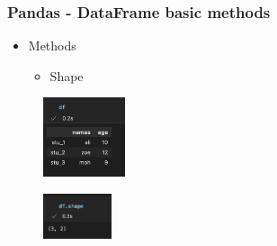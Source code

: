 \begin{frame}\frametitle{Pandas - DataFrame basic methods}
   \begin{minipage}{0.58\linewidth}
      \begin{itemize}
         \item Methods
         \begin{itemize}
            \item Shape
         \end{itemize}
      \end{itemize}
      \vspace{.5cm}
      \begin{figure}[H]
         \includegraphics[width=2.4cm]{../images/illustrations/pandas_df_ex.png}
      \end{figure}
   \end{minipage}
   \begin{minipage}{0.38\linewidth}
      \begin{figure}[H]
         \includegraphics[width=2cm]{../images/illustrations/pandas_shape.png}
      \end{figure}
   \end{minipage}
\end{frame}

